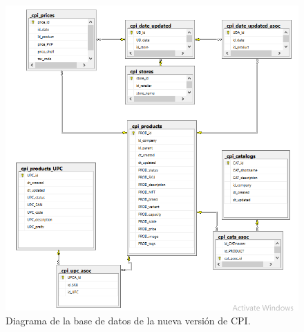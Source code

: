        \begin{figure}[H]
       \begin{center}
       \includegraphics[width=\textwidth]{er.png}
       \caption{Diagrama de la base de datos de la nueva versión de CPI.}
       \label{fig:er_nuevo}
       \end{center}
       \end{figure}


